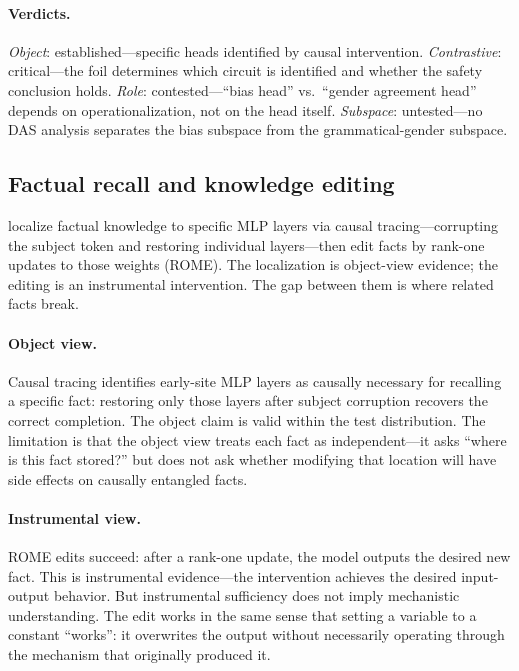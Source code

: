 \documentclass{article}
\begin{document}
\paragraph{Verdicts.}
\emph{Object}: established---specific heads identified by causal
intervention.
\emph{Contrastive}: critical---the foil determines which circuit is
identified and whether the safety conclusion holds.
\emph{Role}: contested---``bias head'' vs.\ ``gender agreement head''
depends on operationalization, not on the head itself.
\emph{Subspace}: untested---no DAS analysis separates the bias subspace
from the grammatical-gender subspace.


\subsection{Factual recall and knowledge editing}\label{app:cs_factual}

\citet{meng2022} localize factual knowledge to specific MLP layers via
causal tracing---corrupting the subject token and restoring individual
layers---then edit facts by rank-one updates to those weights (ROME).
The localization is object-view evidence; the editing is an instrumental
intervention. The gap between them is where related facts break.

\paragraph{Object view.}
Causal tracing identifies early-site MLP layers as causally necessary for
recalling a specific fact: restoring only those layers after subject
corruption recovers the correct completion. The object claim is valid
within the test distribution. The limitation is that the object view
treats each fact as independent---it asks ``where is this fact stored?''
but does not ask whether modifying that location will have side effects
on causally entangled facts.

\paragraph{Instrumental view.}
ROME edits succeed: after a rank-one update, the model outputs the
desired new fact. This is instrumental evidence---the intervention
achieves the desired input-output behavior. But instrumental sufficiency
does not imply mechanistic understanding. The edit works in the same
sense that setting a variable to a constant ``works'': it overwrites the
output without necessarily operating through the mechanism that
originally produced it.
\end{document}
